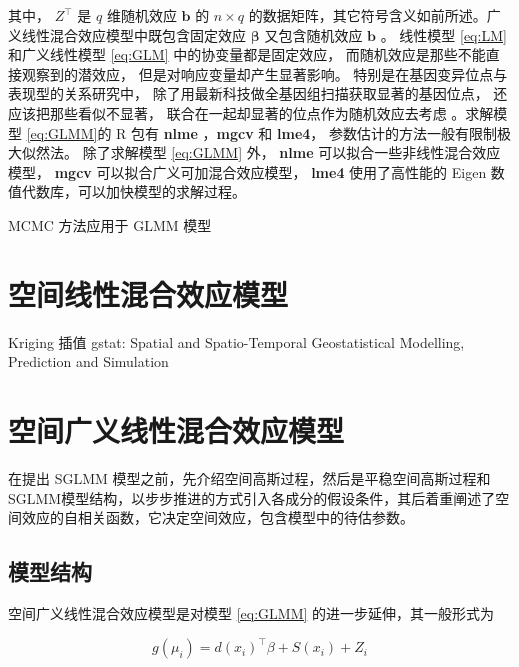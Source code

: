 \documentclass[12pt,a4paper,UTF8,twoside]{book}
\theoremstyle{definition}
\theoremstyle{definition}
\theoremstyle{definition}
\theoremstyle{remark}
\begin{document}
\noindent 其中， \(Z^{\top}\) 是 \(q\) 维随机效应 \(\mathbf{b}\) 的
\(n \times q\)
的数据矩阵，其它符号含义如前所述。广义线性混合效应模型中既包含固定效应
\(\boldsymbol{\beta}\) 又包含随机效应 \(\mathbf{b}\) 。 线性模型
\eqref{eq:LM} 和广义线性模型 \eqref{eq:GLM} 中的协变量都是固定效应，
而随机效应是那些不能直接观察到的潜效应， 但是对响应变量却产生显著影响。
特别是在基因变异位点与表现型的关系研究中，
除了用最新科技做全基因组扫描获取显著的基因位点，
还应该把那些看似不显著， 联合在一起却显著的位点作为随机效应去考虑
\citep{Yang2010Common}。求解模型 \eqref{eq:GLMM}的 R 包有 \textbf{nlme}
，\textbf{mgcv} 和 \textbf{lme4}， 参数估计的方法一般有限制极大似然法。
除了求解模型 \eqref{eq:GLMM} 外， \textbf{nlme}
可以拟合一些非线性混合效应模型， \textbf{mgcv}
可以拟合广义可加混合效应模型， \textbf{lme4} 使用了高性能的 Eigen
数值代数库，可以加快模型的求解过程。

MCMC 方法应用于 GLMM 模型 \citep{MCMCglmm2010}

\section{空间线性混合效应模型}

Kriging 插值 \citep{gstat2004, gstat2016} gstat: Spatial and
Spatio-Temporal Geostatistical Modelling, Prediction and Simulation

\hypertarget{Spatial-Generalized-linear-mixed-effects-models}{%
\section{空间广义线性混合效应模型}\label{Spatial-Generalized-linear-mixed-effects-models}}

在提出 SGLMM
模型之前，先介绍空间高斯过程，然后是平稳空间高斯过程和SGLMM模型结构，以步步推进的方式引入各成分的假设条件，其后着重阐述了空间效应的自相关函数，它决定空间效应，包含模型中的待估参数。

\hypertarget{intro-sglmm}{%
\subsection{模型结构}\label{intro-sglmm}}

空间广义线性混合效应模型是对模型 \eqref{eq:GLMM}
的进一步延伸，其一般形式为

\begin{equation}
g(\mu_i) = d(x_i)^{\top}\beta + S(x_i) + Z_i \label{eq:SGLMM}
\end{equation}
\end{document}
